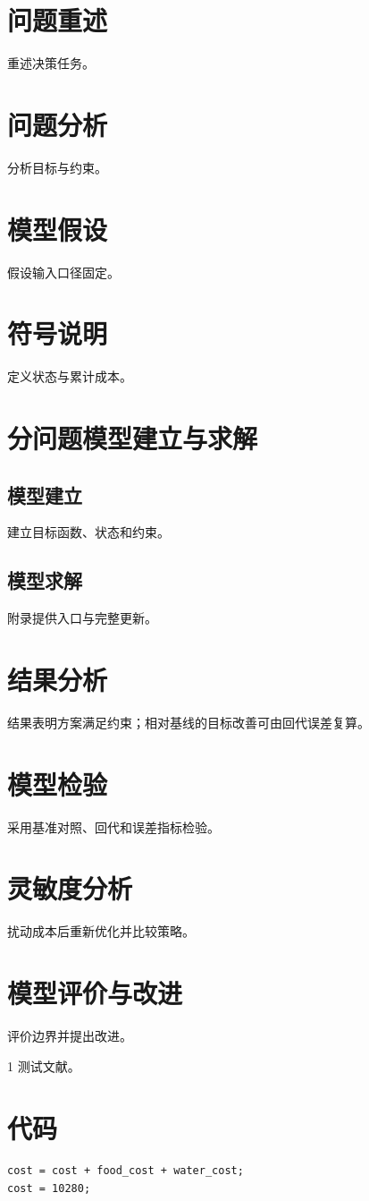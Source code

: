 \documentclass{ctexart}
\begin{document}
\begin{abstract}给出优化模型、结果和回代检验。\end{abstract}
\section{问题重述}重述决策任务。
\section{问题分析}分析目标与约束。
\section{模型假设}假设输入口径固定。
\section{符号说明}定义状态与累计成本。
\section{分问题模型建立与求解}
\subsection{模型建立}建立目标函数、状态和约束。
\subsection{模型求解}附录提供入口与完整更新。
\section{结果分析}
结果表明方案满足约束；相对基线的目标改善可由回代误差复算。
\section{模型检验}采用基准对照、回代和误差指标检验。
\section{灵敏度分析}扰动成本后重新优化并比较策略。
\section{模型评价与改进}评价边界并提出改进。
\begin{thebibliography}{1} 测试文献。\end{thebibliography}
\appendix
\section{代码}
\begin{verbatim}
cost = cost + food_cost + water_cost;
cost = 10280;
\end{verbatim}
\end{document}

